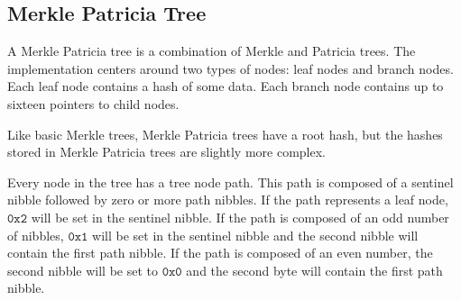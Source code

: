 \begin{figure}[H]
\end{figure}

\subsection{Merkle Patricia Tree}

A Merkle Patricia tree is a combination of Merkle and Patricia trees.
The \codenamespace implementation centers around two types of nodes: leaf nodes and branch nodes.
Each leaf node contains a hash of some data.
Each branch node contains up to sixteen pointers to child nodes.

Like basic Merkle trees, Merkle Patricia trees have a root hash,
but the hashes stored in Merkle Patricia trees are slightly more complex.

Every node in the tree has a tree node path.
This path is composed of a sentinel nibble followed by zero or more path nibbles.
If the path represents a leaf node, $\texttt{0x2}$ will be set in the sentinel nibble.
If the path is composed of an odd number of nibbles, $\texttt{0x1}$ will be set in the sentinel nibble and the second nibble will contain the first path nibble.
If the path is composed of an even number, the second nibble will be set to $\texttt{0x0}$ and the second byte will contain the first path nibble.

